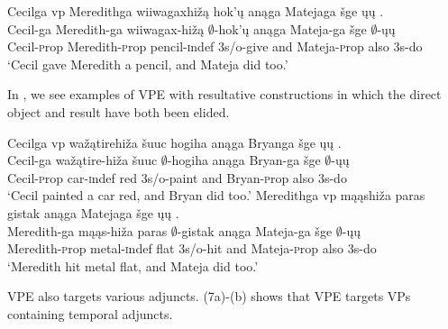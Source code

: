 \documentclass[output=paper]{LSP/langsci}
\begin{document}
\begin{exe}
\ex
\glll Cecilga {\ob}{vp} Meredithga wiiwagaxhižą hok'ų{\cb} anąga Matejaga šge {\ob}ųų{\cb} .\\
Cecil-ga {} Meredith-ga wiiwagax-hižą $\emptyset$-hok'ų anąga Mateja-ga šge $\emptyset$-ųų\\
Cecil-{\textsc prop} {} Meredith-{\textsc prop} pencil-{\textsc indef} {\textsc 3s/o}-give and Mateja-{\textsc prop} also {\textsc 3s}-do\\
\trans `Cecil gave Meredith a pencil, and Mateja did too.'
\end{exe}

In , we see examples of VPE with resultative constructions in which the direct object and result have both been elided. 

\begin{exe}
\ex
\begin{xlist}
\ex
\glll Cecilga  {\ob}{vp} wažątirehiža šuuc hogiha{\cb} anąga Bryanga šge {\ob}ųų{\cb} .\\
Cecil-ga {} wažątire-hiža šuuc $\emptyset$-hogiha anąga Bryan-ga šge $\emptyset$-ųų\\
Cecil-{\textsc prop} {} car-{\textsc indef} red {\textsc 3s/o}-paint and Bryan-{\textsc prop} also {\textsc 3s}-do\\
\trans `Cecil painted a car red, and Bryan did too.'
\ex
\glll Meredithga  {\ob}{vp} mąąshiža paras gistak{\cb} anąga Matejaga šge {\ob}ųų{\cb} .\\
Meredith-ga {} mąąs-hiža paras $\emptyset$-gistak anąga Mateja-ga šge $\emptyset$-ųų\\
Meredith-{\textsc prop} {} metal-{\textsc indef} flat {\textsc 3s/o}-hit and Mateja-{\textsc prop} also {\textsc 3s}-do\\
\trans `Meredith hit metal flat, and Mateja did too.'
\end{xlist}
\end{exe}

VPE also targets various adjuncts. (7a)-(b) shows that VPE targets VPs containing temporal adjuncts. 
\end{document}
